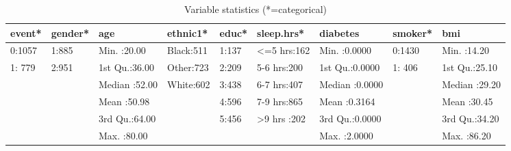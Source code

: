 \documentclass{article}
\begin{document}
\begin{table}[!ht]
\small
\caption{Variable statistics (*=categorical)}
\begin{tabularx}{\linewidth}{XXXXXXXXX}
\toprule
\hline
\textbf{event*} & \textbf{gender*} & \textbf{age} & \textbf{ethnic1*} & \textbf{educ*} & \textbf{sleep.hrs*} & \textbf{diabetes} & \textbf{smoker*} & \textbf{bmi} \\ 
\midrule\hline
0:1057 & 1:885 & Min.   :20.00 & Black:511 & 1:137 & <=5 hrs:162 & Min.   :0.0000 & 0:1430 & Min.   :14.20 \\ \hline
1: 779 & 2:951 & 1st Qu.:36.00 & Other:723 & 2:209 & 5-6 hrs:200 & 1st Qu.:0.0000 & 1: 406 & 1st Qu.:25.10 \\ \hline
 &  & Median :52.00 & White:602 & 3:438 & 6-7 hrs:407 & Median :0.0000 &  & Median :29.20 \\ \hline
 &  & Mean   :50.98 &  & 4:596 & 7-9 hrs:865 & Mean   :0.3164 &  & Mean   :30.45 \\ \hline
 &  & 3rd Qu.:64.00 &  & 5:456 & >9 hrs :202 & 3rd Qu.:0.0000 &  & 3rd Qu.:34.20 \\ \hline
 &  & Max.   :80.00 &  &  &  & Max.   :2.0000 &  & Max.   :86.20 \\ \hline
\bottomrule
\end{tabularx}
\end{table}
\end{document}
